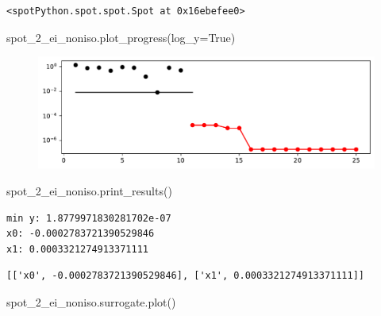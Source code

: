 \documentclass[
  letterpaper,
  DIV=11,
  numbers=noendperiod]{scrreprt}
\newenvironment{Shaded}{\begin{snugshade}}{\end{snugshade}}
\newcommand{\NormalTok}[1]{\textcolor[rgb]{0.00,0.23,0.31}{#1}}
\newcommand{\OperatorTok}[1]{\textcolor[rgb]{0.37,0.37,0.37}{#1}}
\newcommand{\VariableTok}[1]{\textcolor[rgb]{0.07,0.07,0.07}{#1}}
\begin{document}
\begin{verbatim}
<spotPython.spot.spot.Spot at 0x16ebefee0>
\end{verbatim}

\begin{Shaded}
\begin{Highlighting}[]
\NormalTok{spot\_2\_ei\_noniso.plot\_progress(log\_y}\OperatorTok{=}\VariableTok{True}\NormalTok{)}
\end{Highlighting}
\end{Shaded}

\begin{figure}[H]

{\centering \includegraphics{07_spot_ei_files/figure-pdf/cell-15-output-1.pdf}

}

\end{figure}

\begin{Shaded}
\begin{Highlighting}[]
\NormalTok{spot\_2\_ei\_noniso.print\_results()}
\end{Highlighting}
\end{Shaded}

\begin{verbatim}
min y: 1.8779971830281702e-07
x0: -0.0002783721390529846
x1: 0.0003321274913371111
\end{verbatim}

\begin{verbatim}
[['x0', -0.0002783721390529846], ['x1', 0.0003321274913371111]]
\end{verbatim}

\begin{Shaded}
\begin{Highlighting}[]
\NormalTok{spot\_2\_ei\_noniso.surrogate.plot()}
\end{Highlighting}
\end{Shaded}
\end{document}
